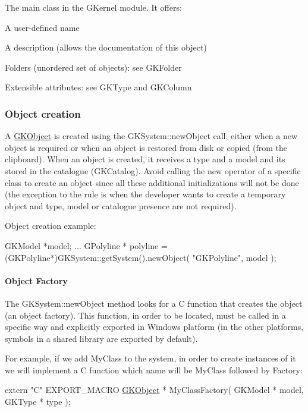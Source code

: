 The main class in the G\+Kernel module. It offers\+:
\begin{DoxyItemize}
\item A user-\/defined name
\item A description (allows the documentation of this object)
\item Folders (unordered set of objects)\+: see G\+K\+Folder
\item Extensible attributes\+: see G\+K\+Type and G\+K\+Column
\end{DoxyItemize}

\subsubsection*{Object creation}

A \hyperlink{classGKObject}{G\+K\+Object} is created using the G\+K\+System\+::new\+Object call, either when a new object is required or when an object is restored from disk or copied (from the clipboard). When an object is created, it receives a type and a model and it\textquotesingle{}s stored in the catalogue (G\+K\+Catalog). Avoid calling the new operator of a specific class to create an object since all these additional initializations will not be done (the exception to the rule is when the developer wants to create a temporary object and type, model or catalogue presence are not required).

Object creation example\+:


\begin{DoxyCode}
GKModel     *model;
...
GPolyline * polyline = (GKPolyline*)GKSystem::getSystem().newObject( \textcolor{stringliteral}{"GKPolyline"}, model );
\end{DoxyCode}


\paragraph*{Object Factory}

The G\+K\+System\+::new\+Object method looks for a C function that creates the object (an object factory). This function, in order to be located, must be called in a specific way and explicitly exported in Windows platform (in the other platforms, symbols in a shared library are exported by default).

For example, if we add My\+Class to the system, in order to create instances of it we will implement a C function which name will be My\+Class followed by Factory\+: 
\begin{DoxyCode}
\textcolor{keyword}{extern} \textcolor{stringliteral}{"C"} EXPORT\_MACRO \hyperlink{classGKObject}{GKObject} * MyClassFactory( GKModel * model, GKType * type );
\end{DoxyCode}


